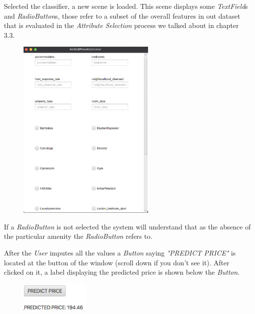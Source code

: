 Selected the classifier, a new scene is loaded. This scene displays some \textit{TextField}s and \textit{RadioButton}s, those refer to a subset of the overall features in out dataset that is evaluated in the \textit{Attribute Selection} process we talked about in chapter 3.3.

\begin{figure}[H]
	\centering
	\includegraphics[width=0.6\textwidth]{img/mainApp.png}  
\end{figure}

If a \textit{RadioButton} is not selected the system will understand that as the absence of the particular amenity the \textit{RadioButton} refers to.

After the \textit{User} imputes all the values a \textit{Button} saying \textit{"PREDICT PRICE"} is located at the button of the window (scroll down if you don't see it). After clicked on it,  a label displaying the predicted price is shown below the \textit{Button}.


\begin{figure}[H]
	\centering
	\includegraphics[width=0.3\textwidth]{img/pricePredicted.png}  
\end{figure}